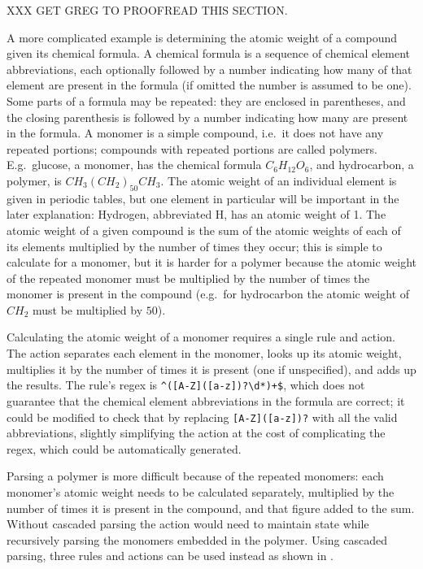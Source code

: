 XXX GET GREG TO PROOFREAD THIS SECTION\@.

A more complicated example is determining the atomic weight of a compound
given its chemical formula.  A chemical formula is a sequence of chemical
element abbreviations, each optionally followed by a number indicating how
many of that element are present in the formula (if omitted the number is
assumed to be one).  Some parts of a formula may be repeated: they are
enclosed in parentheses, and the closing parenthesis is followed by a
number indicating how many are present in the formula.  A monomer is a
simple compound, i.e.\ it does not have any repeated portions; compounds
with repeated portions are called polymers.  E.g.\ glucose, a monomer, has
the chemical formula $C_{6}H_{12}O_{6}$, and hydrocarbon, a polymer, is
$CH_{3}{(CH_{2})}_{50}CH_{3}$.  The atomic weight of an individual element
is given in periodic tables, but one element in particular will be
important in the later explanation: Hydrogen, abbreviated H, has an atomic
weight of 1.  The atomic weight of a given compound is the sum of the
atomic weights of each of its elements multiplied by the number of times
they occur; this is simple to calculate for a monomer, but it is harder for
a polymer because the atomic weight of the repeated monomer must be
multiplied by the number of times the monomer is present in the compound
(e.g.\ for hydrocarbon the atomic weight of $CH_{2}$ must be multiplied by
$50$).

Calculating the atomic weight of a monomer requires a single rule and
action.  The action separates each element in the monomer, looks up its
atomic weight, multiplies it by the number of times it is present (one if
unspecified), and adds up the results.  The rule's regex is
\verb!^([A-Z]([a-z])?\d*)+$!, which does not guarantee that the chemical
element abbreviations in the formula are correct; it could be modified to
check that by replacing \verb![A-Z]([a-z])?! with all the valid
abbreviations, slightly simplifying the action at the cost of complicating
the regex, which could be automatically generated.

Parsing a polymer is more difficult because of the repeated monomers: each
monomer's atomic weight needs to be calculated separately, multiplied by
the number of times it is present in the compound, and that figure added to
the sum.  Without cascaded parsing the action would need to maintain state
while recursively parsing the monomers embedded in the polymer.  Using
cascaded parsing, three rules and actions can be used instead as shown in
.

